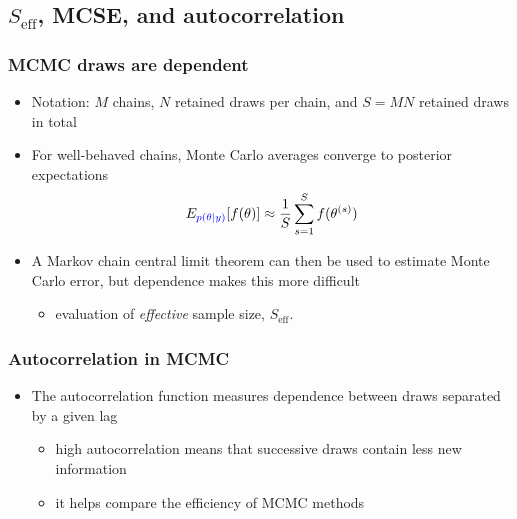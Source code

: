 \documentclass[10pt]{beamer}
\begin{document}


\subsection{$S_\text{eff}$, MCSE, and autocorrelation}
\frame{\subsectionpage}


\begin{frame}

\frametitle{MCMC draws are dependent}

  \begin{itemize}
    \item Notation: $M$ chains, $N$ retained draws per chain, and
      $S=MN$ retained draws in total
    \item For well-behaved chains, Monte Carlo averages converge to
      posterior expectations
      \begin{align*}
        E_{\color{blue} p(\theta|y)}[f(\theta)] \approx \frac{1}{S} \sum_{s=1}^S f(\theta^{(s)})
      \end{align*}
    \item A Markov chain central limit theorem can then be used to estimate
      Monte Carlo error, but dependence makes this more difficult
      \begin{itemize}
        \item evaluation of {\it effective} sample size, $S_\text{eff}$.
      \end{itemize}
    \end{itemize}
\end{frame}

\begin{frame}

\frametitle{Autocorrelation in MCMC}

  \begin{itemize}
  \item The autocorrelation function measures dependence between draws
    separated by a given lag
    \begin{itemize}
    \item high autocorrelation means that successive draws contain less
      new information
    \item it helps compare the efficiency of MCMC methods
    \end{itemize}
  \end{itemize}
\end{frame}
\end{document}
